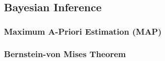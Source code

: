 \subsection{Bayesian Inference}
\subsubsection{Maximum A-Priori Estimation (MAP)}

\subsubsection{Bernstein-von Mises Theorem}
